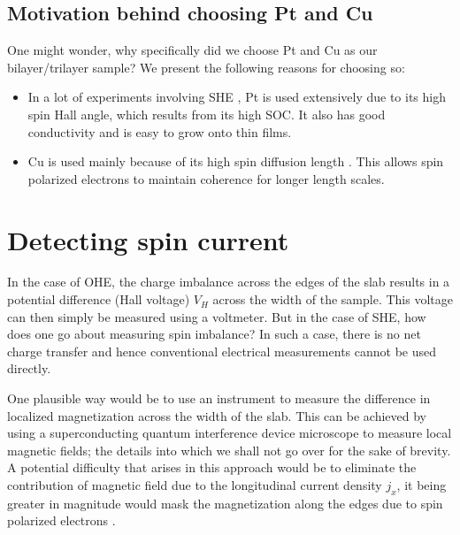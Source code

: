 
\subsection{Motivation behind choosing Pt and Cu}

One might wonder, why specifically did we choose Pt and Cu as our bilayer/trilayer sample?
We present the following reasons for choosing so:

\begin{itemize}
    \item In a lot of experiments involving SHE \cite{rojas2014spin,guo2008intrinsic,liu2011review,gladii2016spin}, Pt is used extensively due to its high spin Hall angle, which results from its high SOC.
        It also has good conductivity and is easy to grow onto thin films.

    \item Cu is used mainly because of its high spin diffusion length \cite{ramaswamy2017extrinsic}.
        This allows spin polarized electrons to maintain coherence for longer length scales.
\end{itemize}


\section{Detecting spin current}

In the case of OHE, the charge imbalance across the edges of the slab results in a potential difference (Hall voltage) \( V_H \) across the width of the sample.
This voltage can then simply be measured using a voltmeter.
But in the case of SHE, how does one go about measuring spin imbalance?
In such a case, there is no net charge transfer and hence conventional electrical measurements cannot be used directly.

One plausible way would be to use an instrument to measure the difference in localized magnetization across the width of the slab.
This can be achieved by using a superconducting quantum interference device microscope \cite{black1993magnetic} to measure local magnetic fields; the details into which we shall not go over for the sake of brevity.
A potential difficulty that arises in this approach would be to eliminate the contribution of magnetic field due to the longitudinal current density \( j_x \), it being greater in magnitude would mask the magnetization along the edges due to spin polarized electrons \cite{hirsch1999spin}.

